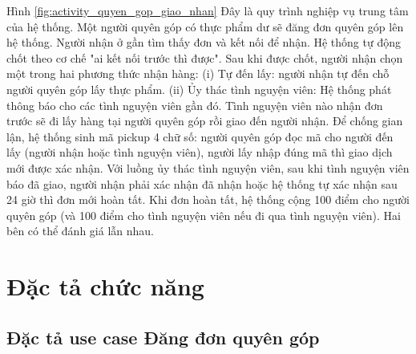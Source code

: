\documentclass[../main.tex]{subfiles}%
\begin{document}
Hình \ref{fig:activity_quyen_gop_giao_nhan} Đây là quy trình nghiệp vụ trung tâm của hệ thống. Một người quyên góp có thực phẩm dư sẽ đăng đơn quyên góp lên hệ thống. Người nhận ở gần tìm thấy đơn và kết nối để nhận. Hệ thống tự động chốt theo cơ chế "ai kết nối trước thì được". Sau khi được chốt, người nhận chọn một trong hai phương thức nhận hàng: (i) Tự đến lấy: người nhận tự đến chỗ người quyên góp lấy thực phẩm. (ii) Ủy thác tình nguyện viên: Hệ thống phát thông báo cho các tình nguyện viên gần đó. Tình nguyện viên nào nhận đơn trước sẽ đi lấy hàng tại người quyên góp rồi giao đến người nhận. Để chống gian lận, hệ thống sinh mã pickup 4 chữ số: người quyên góp đọc mã cho người đến lấy (người nhận hoặc tình nguyện viên), người lấy nhập đúng mã thì giao dịch mới được xác nhận. Với luồng ủy thác tình nguyện viên, sau khi tình nguyện viên báo đã giao, người nhận phải xác nhận đã nhận hoặc hệ thống tự xác nhận sau 24 giờ thì đơn mới hoàn tất. Khi đơn hoàn tất, hệ thống cộng 100 điểm cho người quyên góp (và 100 điểm cho tình nguyện viên nếu đi qua tình nguyện viên). Hai bên có thể đánh giá lẫn nhau.

\section{Đặc tả chức năng}
\label{section:2.4}

\subsection{Đặc tả use case Đăng đơn quyên góp}
\label{section:2.4.1}
\end{document}
